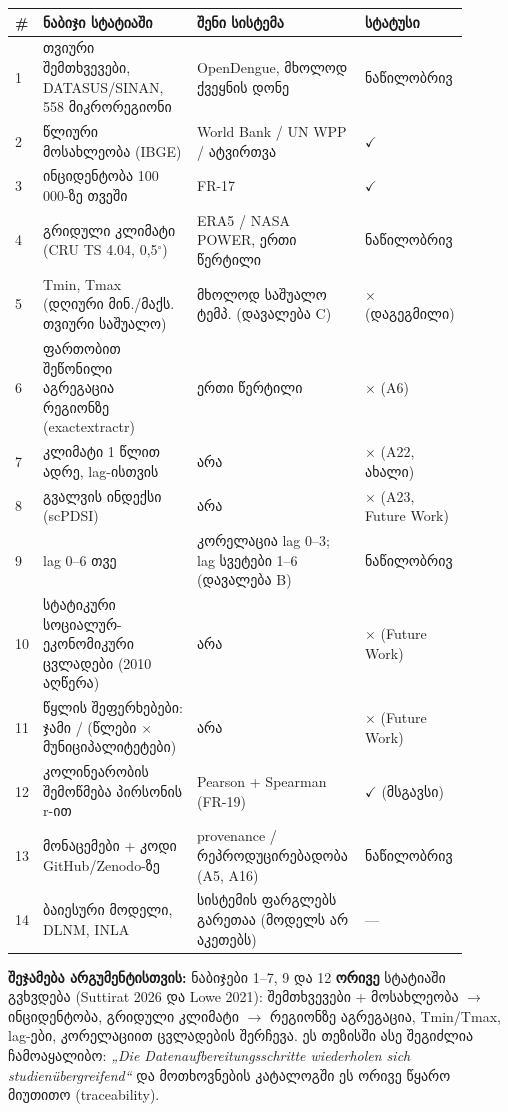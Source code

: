 \documentclass[11pt,a4paper]{article}
\begin{document}
\begin{longtable}{@{}p{0.04\linewidth}p{0.36\linewidth}p{0.38\linewidth}p{0.12\linewidth}@{}}
\toprule
\textbf{\#} & \textbf{ნაბიჯი სტატიაში} & \textbf{შენი სისტემა} & \textbf{სტატუსი}\\
\midrule
\endhead
1 & თვიური შემთხვევები, DATASUS/SINAN, 558 მიკრორეგიონი & OpenDengue, მხოლოდ ქვეყნის დონე & ნაწილობრივ\\
2 & წლიური მოსახლეობა (IBGE) & World Bank / UN WPP / ატვირთვა & $\checkmark$\\
3 & ინციდენტობა 100\,000-ზე თვეში & FR-17 & $\checkmark$\\
4 & გრიდული კლიმატი (CRU TS 4.04, 0,5$^\circ$) & ERA5 / NASA POWER, ერთი წერტილი & ნაწილობრივ\\
5 & Tmin, Tmax (დღიური მინ./მაქს. თვიური საშუალო) & მხოლოდ საშუალო ტემპ. (დავალება C) & $\times$ (დაგეგმილი)\\
6 & ფართობით შეწონილი აგრეგაცია რეგიონზე (exactextractr) & ერთი წერტილი & $\times$ (A6)\\
7 & კლიმატი 1 წლით ადრე, lag-ისთვის & არა & $\times$ (A22, ახალი)\\
8 & გვალვის ინდექსი (scPDSI) & არა & $\times$ (A23, Future Work)\\
9 & lag 0--6 თვე & კორელაცია lag 0--3; lag სვეტები 1--6 (დავალება B) & ნაწილობრივ\\
10 & სტატიკური სოციალურ-ეკონომიკური ცვლადები (2010 აღწერა) & არა & $\times$ (Future Work)\\
11 & წყლის შეფერხებები: ჯამი / (წლები $\times$ მუნიციპალიტეტები) & არა & $\times$ (Future Work)\\
12 & კოლინეარობის შემოწმება პირსონის r-ით & Pearson + Spearman (FR-19) & $\checkmark$ (მსგავსი)\\
13 & მონაცემები + კოდი GitHub/Zenodo-ზე & provenance / რეპროდუცირებადობა (A5, A16) & ნაწილობრივ\\
14 & ბაიესური მოდელი, DLNM, INLA & სისტემის ფარგლებს გარეთაა (მოდელს არ აკეთებს) & ---\\
\bottomrule
\end{longtable}

\begin{etl}
\textbf{შეჯამება არგუმენტისთვის:} ნაბიჯები 1--7, 9 და 12 \textbf{ორივე} სტატიაში გვხვდება (Suttirat 2026 და Lowe 2021):
შემთხვევები + მოსახლეობა $\rightarrow$ ინციდენტობა, გრიდული კლიმატი $\rightarrow$ რეგიონზე აგრეგაცია, Tmin/Tmax, lag-ები,
კორელაციით ცვლადების შერჩევა. ეს თეზისში ასე შეგიძლია ჩამოაყალიბო: \textit{„Die Datenaufbereitungsschritte wiederholen sich
studienübergreifend“} და მოთხოვნების კატალოგში ეს ორივე წყარო მიუთითო (traceability).
\end{etl}
\end{document}
